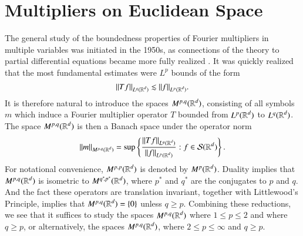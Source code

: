\section{Multipliers on Euclidean Space}

The general study of the boundedness properties of Fourier multipliers in multiple variables was initiated in the 1950s, as connections of the theory to partial differential equations became more fully realized \cite{Hormander1}. It was quickly realized that the most fundamental estimates were $L^p$ bounds of the form
%
\[ \| Tf \|_{L^q(\operatorname{\mathbb{R}}^d)} \lesssim \| f \|_{L^p(\operatorname{\mathbb{R}}^d)}. \]
%
%
%
It is therefore natural to introduce the spaces $M^{p,q}(\operatorname{\mathbb{R}}^d)$, consisting of all symbols $m$ which induce a Fourier multiplier operator $T$ bounded from $L^p(\operatorname{\mathbb{R}}^d)$ to $L^q(\operatorname{\mathbb{R}}^d)$. The space $M^{p,q}(\operatorname{\mathbb{R}}^d)$ is then a Banach space under the operator norm
%
\[ \| m \|_{M^{p,q}(\operatorname{\mathbb{R}}^d)} = \sup \left\{ \frac{\| T f \|_{L^q(\operatorname{\mathbb{R}}^d)}}{\| f \|_{L^p(\operatorname{\mathbb{R}}^d)}} : f \in \mathcal{S}(\operatorname{\mathbb{R}}^d) \right\}. \]
%
For notational convenience, $M^{p,p}(\operatorname{\mathbb{R}}^d)$ is denoted by $M^p(\operatorname{\mathbb{R}}^d)$. Duality implies that $M^{p,q}(\operatorname{\mathbb{R}}^d)$ is isometric to $M^{q^* \negmedspace ,p^*}(\operatorname{\mathbb{R}}^d)$, where $p^*$ and $q^*$ are the conjugates to $p$ and $q$. And the fact these operators are translation invariant, together with Littlewood's Principle, implies that $M^{p,q}(\operatorname{\mathbb{R}}^d) = \{ 0 \}$ unless $q \geq p$. Combining these reductions, we see that it suffices to study the spaces $M^{p,q}(\operatorname{\mathbb{R}}^d)$ where $1 \leq p \leq 2$ and where $q \geq p$, or alternatively, the spaces $M^{p,q}(\operatorname{\mathbb{R}}^d)$, where $2 \leq p \leq \infty$ and $q \geq p$.

